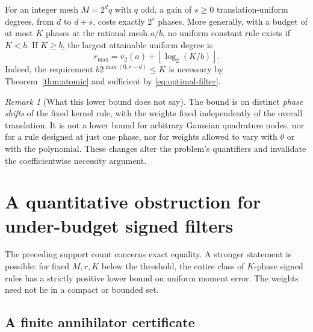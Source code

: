 \documentclass[11pt,a4paper]{article}
\numberwithin{equation}{section}
\theoremstyle{definition}
\theoremstyle{remark}
\newtheorem{remark}[theorem]{Remark}
\begin{document}
For an integer mesh $M=2^dq$ with $q$ odd, a gain of $s\ge0$
translation-uniform degrees, from $d$ to $d+s$, costs exactly $2^s$
phases. More generally, with a budget of at most $K$ phases at the
rational mesh $a/b$, no uniform constant rule exists if $K<b$.
If $K\ge b$, the largest attainable uniform degree is
\begin{equation}
 r_{\max}=v_2(a)+\left\lfloor\log_2(K/b)\right\rfloor.
 \label{eq:budget}
\end{equation}
Indeed, the requirement $b2^{\max(0,r-d)}\le K$ is necessary by
Theorem~\ref{thm:atomic} and sufficient by \eqref{eq:optimal-filter}.

\begin{remark}[What this lower bound does not say]
The bound is on distinct \emph{phase shifts} of the fixed kernel rule,
with the weights fixed independently of the overall translation.
It is not a lower bound for arbitrary Gaussian quadrature nodes, nor for
a rule designed at just one phase, nor for weights allowed to vary with
$\theta$ or with the polynomial. These changes alter the problem's
quantifiers and invalidate the coefficientwise necessity argument.
\end{remark}

\section{A quantitative obstruction for under-budget signed filters}

The preceding support count concerns exact equality. A stronger statement
is possible: for fixed $M,r,K$ below the threshold, the entire class of
$K$-phase signed rules has a strictly positive lower bound on uniform
moment error. The weights need not lie in a compact or bounded set.

\subsection{A finite annihilator certificate}
\end{document}
